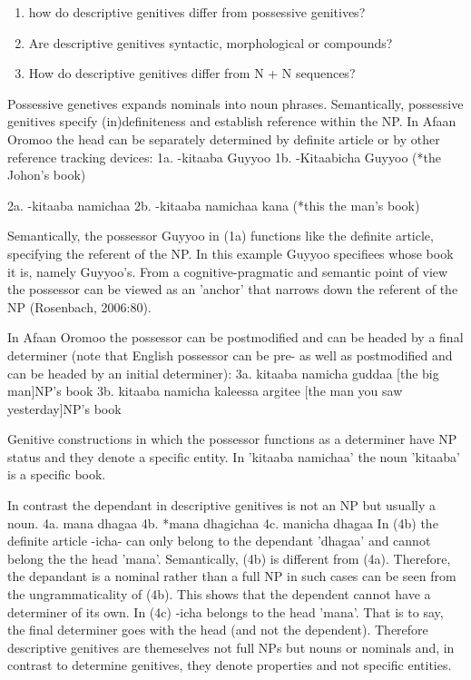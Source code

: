 \documentclass[11pt,a4paper]{article}
\begin{document}
	\begin{enumerate}
		\item how do descriptive genitives differ from possessive genitives?
		\item Are descriptive genitives syntactic, morphological or compounds?
		\item How do descriptive genitives differ from N + N sequences?
	\end{enumerate}
	
	Possessive genetives expands nominals into noun phrases. Semantically, possessive genitives specify (in)definiteness and establish
	reference within the NP. 
	In Afaan Oromoo the head can be separately determined by definite article or by other reference tracking devices:
	1a. -kitaaba Guyyoo
	1b. -Kitaabicha Guyyoo  (*the Johon's book)
	
	2a. -kitaaba namichaa 
	2b. -kitaaba namichaa kana (*this the man's book)
	
	Semantically, the possessor Guyyoo in (1a) functions like the definite article, specifying the referent of the NP. 
	In this example Guyyoo specifiees whose book it is, namely Guyyoo's. From a cognitive-pragmatic and semantic point of view
	the possessor can be viewed as an 'anchor' that narrows down the referent of the NP (Rosenbach, 2006:80). 
	
	In Afaan Oromoo the possessor can be postmodified and can be headed by a final determiner (note that English possessor can be pre- as well as 
	postmodified 
	and can be headed by an initial determiner):
	3a. kitaaba namicha guddaa [the big man]NP's book
	3b. kitaaba namicha kaleessa argitee [the man you saw yesterday]NP's book
	
	Genitive constructions in which the possessor functions as a determiner have NP status and they denote a specific
	entity. In 'kitaaba namichaa' the noun 'kitaaba' is a specific book. 
	
	In contrast the dependant in descriptive genitives is not an NP but usually a noun. 
	4a. mana dhagaa
	4b. *mana dhagichaa
	4c. manicha dhagaa
	In (4b) the definite article -icha- can only belong to the dependant 'dhagaa' and cannot belong the the head 'mana'. Semantically, (4b) is different 
	from (4a). 
	Therefore, the depandant is a nominal rather than a full NP in such cases can be seen from the ungrammaticality of 
	(4b). This shows that the dependent cannot have a determiner of its own. In (4c) -icha belongs to the head 'mana'. That is to say, the final determiner 
	goes with the head (and not
	the dependent). Therefore descriptive genitives are themeselves not full NPs but nouns or nominals and, in contrast to
	determine genitives, they denote properties and not specific entities. 
	
\end{document}
